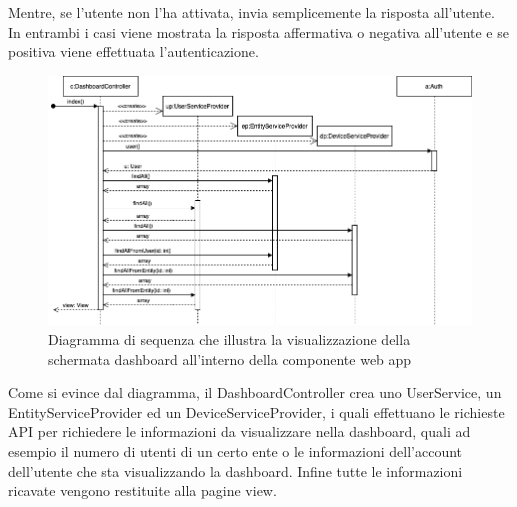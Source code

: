 \begin{landscape}
		\newline
		Mentre, se l'utente non l'ha attivata, invia semplicemente la risposta all'utente. In entrambi i casi viene mostrata la risposta affermativa o negativa all'utente e se positiva viene effettuata l'autenticazione.
		\begin{figure}[H]
			\centering
			\includegraphics[scale=0.600]{res/images/WEBAPP/Dashboard.index.png}
			\caption{Diagramma di sequenza che illustra la visualizzazione della schermata dashboard all'interno della componente web app}
			\label{Diagramma 24}
		\end{figure}
		Come si evince dal diagramma, il DashboardController crea uno UserService, un EntityServiceProvider ed un DeviceServiceProvider, i quali effettuano le richieste API per richiedere le informazioni da visualizzare nella dashboard, quali ad esempio il numero di utenti di un certo ente o le informazioni dell'account dell'utente che sta visualizzando la dashboard. Infine tutte le informazioni ricavate vengono restituite alla pagine view.
	\end{landscape}